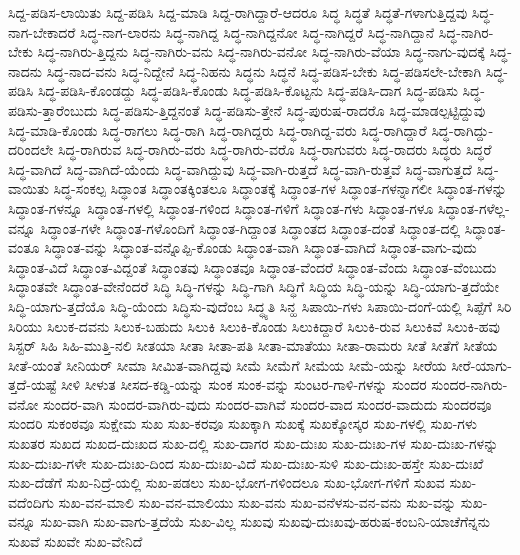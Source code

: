 {ಸಿದ್ದ-ಪಡಿಸ-ಲಾಯಿತು
ಸಿದ್ದ-ಪಡಿಸಿ
ಸಿದ್ದ-ಮಾಡಿ
ಸಿದ್ದ-ರಾಗಿದ್ದಾರೆ-ಆದರೂ
ಸಿದ್ಧ
ಸಿದ್ಧತೆ
ಸಿದ್ಧತೆ-ಗಳಾಗುತ್ತಿದ್ದವು
ಸಿದ್ಧ-ನಾಗ-ಬೇಕಾದರೆ
ಸಿದ್ಧ-ನಾಗ-ಲಾರನು
ಸಿದ್ಧ-ನಾಗಿದ್ದ
ಸಿದ್ಧ-ನಾಗಿದ್ದನೋ
ಸಿದ್ಧ-ನಾಗಿದ್ದರೆ
ಸಿದ್ಧ-ನಾಗಿದ್ದಾನೆ
ಸಿದ್ಧ-ನಾಗಿರ-ಬೇಕು
ಸಿದ್ಧ-ನಾಗಿರು-ತ್ತಿದ್ದನು
ಸಿದ್ಧ-ನಾಗಿರು-ವನು
ಸಿದ್ಧ-ನಾಗಿರು-ವನೋ
ಸಿದ್ಧ-ನಾಗಿರು-ವೆಯಾ
ಸಿದ್ಧ-ನಾಗು-ವುದಕ್ಕೆ
ಸಿದ್ಧ-ನಾದನು
ಸಿದ್ಧ-ನಾದ-ವನು
ಸಿದ್ಧ-ನಿದ್ದೇನೆ
ಸಿದ್ಧ-ನಿಹನು
ಸಿದ್ಧನು
ಸಿದ್ಧನೆ
ಸಿದ್ಧ-ಪಡಿಸ-ಬೇಕು
ಸಿದ್ಧ-ಪಡಿಸಲೇ-ಬೇಕಾಗಿ
ಸಿದ್ಧ-ಪಡಿಸಿ
ಸಿದ್ಧ-ಪಡಿಸಿ-ಕೊಂಡದ್ದು
ಸಿದ್ಧ-ಪಡಿಸಿ-ಕೊಂಡು
ಸಿದ್ಧ-ಪಡಿಸಿ-ಕೊಟ್ಟನು
ಸಿದ್ಧ-ಪಡಿಸಿ-ದಾಗ
ಸಿದ್ಧ-ಪಡಿಸು
ಸಿದ್ಧ-ಪಡಿಸು-ತ್ತಾರೆಂಬುದು
ಸಿದ್ಧ-ಪಡಿಸು-ತ್ತಿದ್ದನಂತೆ
ಸಿದ್ಧ-ಪಡಿಸು-ತ್ತೇನೆ
ಸಿದ್ಧ-ಪುರುಷ-ರಾದರೊ
ಸಿದ್ಧ-ಮಾಡಲ್ಪಟ್ಟಿದ್ದುವು
ಸಿದ್ಧ-ಮಾಡಿ-ಕೊಂಡು
ಸಿದ್ಧ-ರಾಗಲು
ಸಿದ್ಧ-ರಾಗಿ
ಸಿದ್ಧ-ರಾಗಿದ್ದರು
ಸಿದ್ಧ-ರಾಗಿದ್ದ-ವರು
ಸಿದ್ಧ-ರಾಗಿದ್ದಾರೆ
ಸಿದ್ಧ-ರಾಗಿದ್ದು-ದರಿಂದಲೇ
ಸಿದ್ಧ-ರಾಗಿರುವ
ಸಿದ್ಧ-ರಾಗಿರು-ವರು
ಸಿದ್ಧ-ರಾಗಿರು-ವರೊ
ಸಿದ್ಧ-ರಾಗುವರು
ಸಿದ್ಧ-ರಾದರು
ಸಿದ್ಧರು
ಸಿದ್ಧರೆ
ಸಿದ್ಧ-ವಾಗಿದೆ
ಸಿದ್ಧ-ವಾಗಿದೆ-ಯೆಂದು
ಸಿದ್ಧ-ವಾಗಿದ್ದುವು
ಸಿದ್ಧ-ವಾಗಿ-ರುತ್ತದೆ
ಸಿದ್ಧ-ವಾಗಿ-ರುತ್ತವೆ
ಸಿದ್ಧ-ವಾಗುತ್ತದೆ
ಸಿದ್ಧ-ವಾಯಿತು
ಸಿದ್ಧ-ಸಂಕಲ್ಪ
ಸಿದ್ಧಾಂತ
ಸಿದ್ಧಾಂತಕ್ಕಿಂತಲೂ
ಸಿದ್ಧಾಂತಕ್ಕೆ
ಸಿದ್ಧಾಂತ-ಗಳ
ಸಿದ್ಧಾಂತ-ಗಳನ್ನಾಗಲೀ
ಸಿದ್ಧಾಂತ-ಗಳನ್ನು
ಸಿದ್ಧಾಂತ-ಗಳನ್ನೂ
ಸಿದ್ಧಾಂತ-ಗಳಲ್ಲಿ
ಸಿದ್ಧಾಂತ-ಗಳಿಂದ
ಸಿದ್ಧಾಂತ-ಗಳಿಗೆ
ಸಿದ್ಧಾಂತ-ಗಳು
ಸಿದ್ಧಾಂತ-ಗಳೂ
ಸಿದ್ಧಾಂತ-ಗಳೆಲ್ಲ-ವನ್ನೂ
ಸಿದ್ಧಾಂತ-ಗಳೇ
ಸಿದ್ಧಾಂತ-ಗಳೊಂದಿಗೆ
ಸಿದ್ಧಾಂತ-ಗಿದ್ದಾಂತ
ಸಿದ್ಧಾಂತದ
ಸಿದ್ಧಾಂತ-ದಂತೆ
ಸಿದ್ಧಾಂತ-ದಲ್ಲಿ
ಸಿದ್ಧಾಂತ-ವಂತೂ
ಸಿದ್ಧಾಂತ-ವನ್ನು
ಸಿದ್ಧಾಂತ-ವನ್ನೊಪ್ಪಿ-ಕೊಂಡು
ಸಿದ್ಧಾಂತ-ವಾಗಿ
ಸಿದ್ಧಾಂತ-ವಾಗಿದೆ
ಸಿದ್ಧಾಂತ-ವಾಗು-ವುದು
ಸಿದ್ಧಾಂತ-ವಿದೆ
ಸಿದ್ಧಾಂತ-ವಿದ್ದಂತೆ
ಸಿದ್ಧಾಂತವು
ಸಿದ್ಧಾಂತವೂ
ಸಿದ್ಧಾಂತ-ವೆಂದರೆ
ಸಿದ್ಧಾಂತ-ವೆಂದು
ಸಿದ್ಧಾಂತ-ವೆಂಬುದು
ಸಿದ್ಧಾಂತವೇ
ಸಿದ್ಧಾಂತ-ವೇನೆಂದರೆ
ಸಿದ್ಧಿ
ಸಿದ್ಧಿ-ಗಳನ್ನು
ಸಿದ್ಧಿ-ಗಾಗಿ
ಸಿದ್ಧಿಗೆ
ಸಿದ್ಧಿಯ
ಸಿದ್ಧಿ-ಯನ್ನು
ಸಿದ್ಧಿ-ಯಾಗು-ತ್ತದೆಯೇ
ಸಿದ್ಧಿ-ಯಾಗು-ತ್ತದೆಯೊ
ಸಿದ್ಧಿ-ಯೆಂದು
ಸಿದ್ಧಿಸು-ವುದೆಂಬ
ಸಿದ್ಧ್ಯತಿ
ಸಿನ್ಹ
ಸಿಪಾಯಿ-ಗಳು
ಸಿಪಾಯಿ-ದಂಗೆ-ಯಲ್ಲಿ
ಸಿಪ್ಪೆಗೆ
ಸಿರಿ
ಸಿರಿಯು
ಸಿಲುಕ-ದವನು
ಸಿಲುಕ-ಬಹುದು
ಸಿಲುಕಿ
ಸಿಲುಕಿ-ಕೊಂಡು
ಸಿಲುಕಿದ್ದಾರೆ
ಸಿಲುಕಿ-ರುವ
ಸಿಲುಕಿವೆ
ಸಿಲುಕಿ-ಹವು
ಸಿಸ್ಟರ್
ಸಿಹಿ
ಸಿಹಿ-ಮುತ್ತಿ-ನಲಿ
ಸೀತಯಾ
ಸೀತಾ
ಸೀತಾ-ಪತಿ
ಸೀತಾ-ಮಾತೆಯು
ಸೀತಾ-ರಾಮರು
ಸೀತೆ
ಸೀತೆಗೆ
ಸೀತೆಯ
ಸೀತೆ-ಯಂತೆ
ಸೀನಿಯರ್
ಸೀಮಾ
ಸೀಮಿತ-ವಾಗಿದ್ದವು
ಸೀಮೆ
ಸೀಮೆಗೆ
ಸೀಮೆಯ
ಸೀಮೆ-ಯನ್ನು
ಸೀರೆಯ
ಸೀರೆ-ಯಾಗು-ತ್ತದೆ-ಯಷ್ಟೆ
ಸೀಳಿ
ಸೀಳುತ
ಸೀಸದ-ಕಡ್ಡಿ-ಯನ್ನು
ಸುಂಕ
ಸುಂಕ-ವನ್ನು
ಸುಂಟರ-ಗಾಳಿ-ಗಳನ್ನು
ಸುಂದರ
ಸುಂದರ-ನಾಗಿರು-ವನೋ
ಸುಂದರ-ವಾಗಿ
ಸುಂದರ-ವಾಗಿರು-ವುದು
ಸುಂದರ-ವಾಗಿವೆ
ಸುಂದರ-ವಾದ
ಸುಂದರ-ವಾದುದು
ಸುಂದರವೂ
ಸುಂದರಿ
ಸುಕಂಠವೂ
ಸುಕ್ಷೇಮ
ಸುಖ
ಸುಖ-ಕರವೂ
ಸುಖಕ್ಕಾಗಿ
ಸುಖಕ್ಕೆ
ಸುಖಕ್ಕೋಸ್ಕರ
ಸುಖ-ಗಳಲ್ಲಿ
ಸುಖ-ಗಳು
ಸುಖತರ
ಸುಖದ
ಸುಖದ-ದುಃಖದ
ಸುಖ-ದಲ್ಲಿ
ಸುಖ-ದಾಗರ
ಸುಖ-ದುಃಖ
ಸುಖ-ದುಃಖ-ಗಳ
ಸುಖ-ದುಃಖ-ಗಳನ್ನು
ಸುಖ-ದುಃಖ-ಗಳೇ
ಸುಖ-ದುಃಖ-ದಿಂದ
ಸುಖ-ದುಃಖ-ವಿದೆ
ಸುಖ-ದುಃಖ-ಸುಳಿ
ಸುಖ-ದುಃಖ-ಹಸ್ತೇ
ಸುಖ-ದುಃಖೆ
ಸುಖ-ದೆಡೆಗೆ
ಸುಖ-ನಿದ್ರೆ-ಯಲ್ಲಿ
ಸುಖ-ಪಡಲು
ಸುಖ-ಭೋಗ-ಗಳಿಂದಲೂ
ಸುಖ-ಭೋಗ-ಗಳಿಗೆ
ಸುಖವ
ಸುಖ-ವದೆಂದಿಗು
ಸುಖ-ವನ-ಮಾಲಿ
ಸುಖ-ವನ-ಮಾಲಿಯು
ಸುಖ-ವನು
ಸುಖ-ವನೆಳಸು-ವನ-ವನು
ಸುಖ-ವನ್ನು
ಸುಖ-ವನ್ನೂ
ಸುಖ-ವಾಗಿ
ಸುಖ-ವಾಗು-ತ್ತದೆಯೆ
ಸುಖ-ವಿಲ್ಲ
ಸುಖವು
ಸುಖವು-ದುಃಖವು-ಹರುಷ-ಕಂಬನಿ-ಯಾಚೆಗೆನ್ನನು
ಸುಖವೆ
ಸುಖವೇ
ಸುಖ-ವೇನಿದೆ
}
